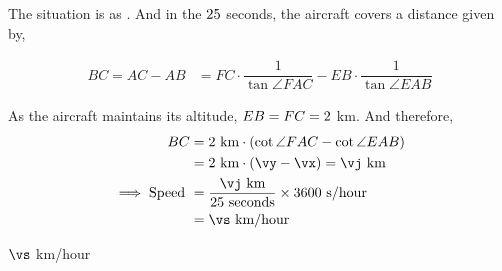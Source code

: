 \begin{solution}[\halfpage]
	The situation is as \asif. And in the $25$ seconds, the aircraft covers 
	a distance given by, 
	
	\begin{align}
		BC = AC - AB &= FC\cdot\dfrac{1}{\tan\angle{FAC}} - EB\cdot\dfrac{1}{\tan\angle{EAB}}
	\end{align}
	
	As the aircraft maintains its altitude, $EB = FC = 2$ km. And therefore, 
	\begin{align}
    BC &= \vh\text{ km}\cdot(\cot\angle{FAC}-\cot\angle{EAB}) \\
      &= \vh\text{ km}\cdot(\vy-\vx) = \vj\text{ km} \\
      \implies\text{Speed } &= \dfrac{\vj\text{ km}}{\vt\text{ seconds}}\times 3600\text{ s/hour} \\
      &= \vs\text{ km/hour}
	\end{align}
\end{solution}
\ifprintanswers\begin{codex}$\vs$ km/hour\end{codex}\fi
